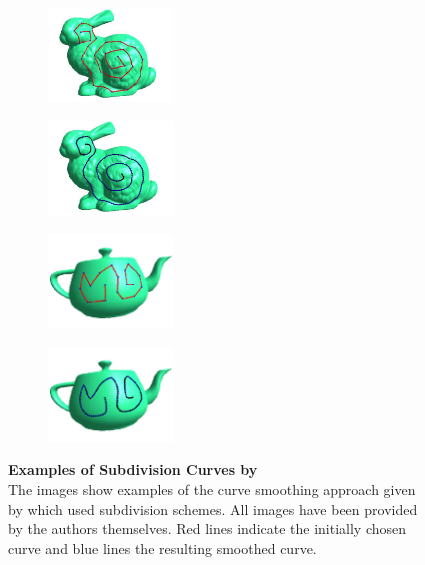 \documentclass{stdlocal}
\begin{document}
\begin{figure}[t]
  \centering
  \begin{subfigure}[b]{0.23\linewidth}
    \centering
    \includegraphics[height=2.5cm]{images/morera2008-1.png}
  \end{subfigure}
  \begin{subfigure}[b]{0.23\linewidth}
    \centering
    \includegraphics[height=2.5cm]{images/morera2008-2.png}
  \end{subfigure}
  \begin{subfigure}[b]{0.25\linewidth}
    \centering
    \includegraphics[height=2.5cm]{images/morera2008-3.png}
  \end{subfigure}
  \begin{subfigure}[b]{0.25\linewidth}
    \centering
    \includegraphics[height=2.5cm]{images/morera2008-4.png}
  \end{subfigure}
  \caption[Examples of Subdivision Curves by \textcite{morera2008}]{%
    \textbf{Examples of Subdivision Curves by \textcite{morera2008}}\\
    The images show examples of the curve smoothing approach given by \textcite{morera2008} which used subdivision schemes.
    All images have been provided by the authors themselves.
    Red lines indicate the initially chosen curve and blue lines the resulting smoothed curve.
  }
  \label{fig:morera2008}
\end{figure}
\end{document}
